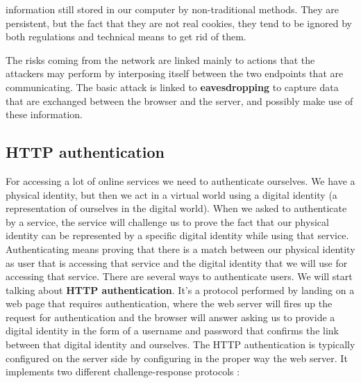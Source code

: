 \begin{itemize}
information still stored in our computer by non-traditional methods. They are persistent, but the fact that they are not real cookies, they tend to be ignored by both regulations and technical means to get rid of them.
\end{itemize}

The risks coming from the network are linked mainly to actions that the attackers may perform by interposing itself between the two endpoints that are communicating. The basic attack is linked to \textbf{eavesdropping} to capture data that are exchanged between the browser and the server, and possibly make use of these information. 

\subsection{HTTP authentication}
For accessing a lot of online services we need to authenticate ourselves. We have a physical identity, but then we act in a virtual world using a digital identity (a representation of ourselves in the digital world). When we asked to authenticate by a service, the service will challenge us to prove the fact that our physical identity can be represented by a specific digital identity while using that service. Authenticating means proving that there is a match between our physical identity as user that is accessing that service and the digital identity that we will use for accessing that service. There are several ways to authenticate users. We will start talking about \textbf{HTTP authentication}. It's a protocol performed by landing on a web page that requires authentication, where the web server will fires up the request for authentication and the browser will answer asking us to provide a digital identity in the form of a username and password that confirms the link between that digital identity and ourselves. The HTTP authentication is typically configured on the server side by configuring in the proper way the web server. It implements two different challenge-response protocols :
